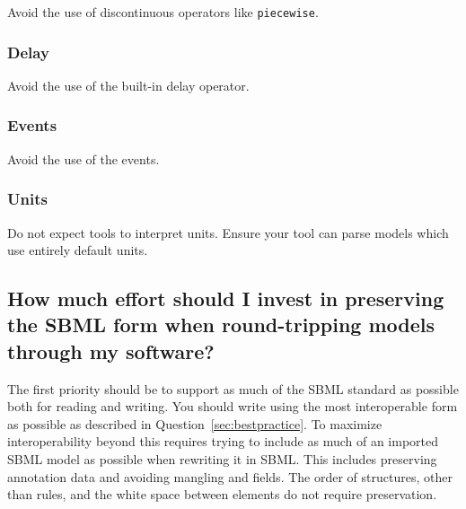 \documentclass{sbmlfaq}
\begin{document}
Avoid the use of discontinuous operators like \texttt{piecewise}.

\subsubsection{Delay}

Avoid the use of the built-in delay operator.

\subsubsection{Events}

Avoid the use of the events.

\subsubsection{Units}

Do not expect tools to interpret units.  Ensure your tool can parse models which use entirely default units.

\subsection{How much effort should I invest in preserving the SBML form
  when round-tripping models through my software?} 

The first priority should be to support as much of the SBML standard as possible both for reading and writing.
You should write using the most interoperable form as possible as described in Question~\ref{sec:bestpractice}.
To maximize interoperability beyond this requires
trying to include as much of an imported SBML model as possible when rewriting it in SBML.  This includes preserving
annotation data and avoiding mangling  and  fields.  The order of structures, other than rules,
and the white space between elements do not require preservation.

%
\end{document}
